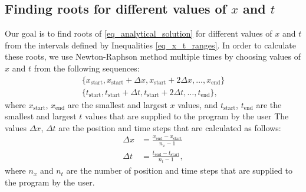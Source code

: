 \subsection{Finding roots for different values of $x$ and $t$}

Our goal is to find roots of \autoref{eq_analytical_solution} for different values of $x$ and $t$ from the intervals defined by Inequalities \ref{eq_x_t_ranges}. In order to calculate these roots, we use Newton-Raphson method multiple times by choosing values of $x$ and $t$ from the following sequences:
\begin{align*}
  \{ x_{\textrm{start}}, x_{\textrm{start}} + \Delta x, x_{\textrm{start}} + 2 \Delta x, \dots, x_{\textrm{end}} \} \\
  \{ t_{\textrm{start}}, t_{\textrm{start}} + \Delta t, t_{\textrm{start}} + 2 \Delta t, \dots, t_{\textrm{end}} \},
\end{align*}
where $x_{\textrm{start}}$, $x_{\textrm{end}}$ are the smallest and largest $x$ values, and $t_{\textrm{start}}$, $t_{\textrm{end}}$ are the smallest and largest $t$ values that are supplied to the program by the user The values $\Delta x$, $\Delta t$ are the position and time steps that are calculated as follows:
\begin{align*}
  \Delta x &= \frac{x_{\textrm{end}} - x_{\textrm{start}}}{n_x - 1} \\
  \Delta t &= \frac{t_{\textrm{end}} - t_{\textrm{start}}}{n_t - 1},
\end{align*}
where $n_x$ and $n_t$ are the number of position and time steps that are supplied to the program by the user.




